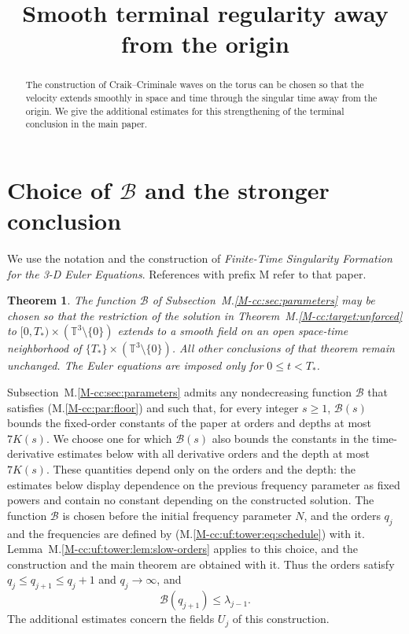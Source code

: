 \documentclass[11pt]{amsart}
\title[Smooth terminal regularity]{Smooth terminal regularity away from the origin}
\author{}\date{}
\numberwithin{equation}{section}
\newtheorem{theorem}{Theorem}[section]
\begin{document}
\raggedbottom
\begin{abstract}
The construction of Craik--Criminale waves on the torus can be chosen so that
the velocity extends smoothly in space and time through the singular time
away from the origin. We give the additional estimates for this strengthening
of the terminal conclusion in the main paper.
\end{abstract}
\maketitle

\section{Choice of \texorpdfstring{$\mathcal B$}{B} and the stronger conclusion}

We use the notation and the construction of
\emph{Finite-Time Singularity Formation for the 3-D Euler Equations}. References with prefix M refer to that paper.

\begin{theorem}\label{aux:terminal:smooth}
The function $\mathcal B$ of Subsection~M.\ref{M-cc:sec:parameters} may be chosen so that
the restriction of the solution in Theorem~M.\ref{M-cc:target:unforced} to
$[0,T_*)\times(\mathbb T^3\setminus\{0\})$ extends to a smooth field on an
open space-time neighborhood of
$\{T_*\}\times(\mathbb T^3\setminus\{0\})$.
All other conclusions of that theorem remain unchanged.
The Euler equations are imposed only for $0\le t<T_*$.
\end{theorem}

Subsection~M.\ref{M-cc:sec:parameters} admits any nondecreasing
function $\mathcal B$ that satisfies \textup{(M.\ref{M-cc:par:floor})}
and such that, for every integer $s\ge1$, $\mathcal B(s)$ bounds the
fixed-order constants of the paper at orders and depths at most
$7K(s)$. We choose one for which $\mathcal B(s)$ also bounds the
constants in the time-derivative estimates below with all derivative
orders and the depth at most $7K(s)$.
These quantities depend only on the orders and the depth:
the estimates below display dependence on the previous frequency parameter as fixed
powers and contain no constant depending on the constructed solution.
The function $\mathcal B$ is chosen before the initial frequency
parameter $N$, and the orders $q_j$ and the frequencies are defined by
\textup{(M.\ref{M-cc:uf:tower:eq:schedule})} with it.
Lemma~M.\ref{M-cc:uf:tower:lem:slow-orders} applies to this choice,
and the construction and the main theorem are obtained with it. Thus
the orders satisfy $q_j\le q_{j+1}\le q_j+1$ and $q_j\to\infty$, and
\begin{equation}\label{aux:terminal:growth}
 \mathcal B(q_{j+1})\le\lambda_{j-1}.
\end{equation}
The additional estimates concern the fields $U_j$ of this construction.
\end{document}
